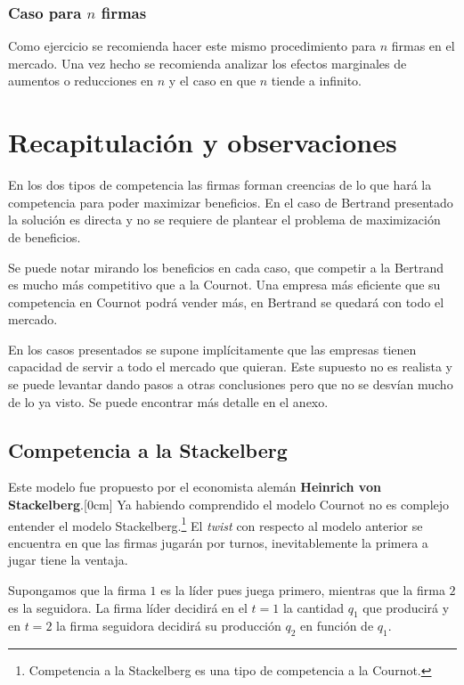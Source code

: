 \subsubsection*{Caso para $n$ firmas}
Como ejercicio se recomienda hacer este mismo procedimiento para $n$ firmas en el mercado. Una vez hecho se recomienda analizar los efectos marginales de aumentos o reducciones en $n$ y el caso en que $n$ tiende a infinito.


\section*{Recapitulación y observaciones}

En los dos tipos de competencia las firmas forman creencias de lo que hará la competencia para poder maximizar beneficios. En el caso de Bertrand presentado la solución es directa y no se requiere de plantear el problema de maximización de beneficios. 

Se puede notar mirando los beneficios en cada caso, que competir a la Bertrand es mucho más competitivo que a la Cournot. Una empresa más eficiente que su competencia en Cournot podrá vender más, en Bertrand se quedará con todo el mercado. 

En los casos presentados se supone implícitamente que las empresas tienen capacidad de servir a todo el mercado que quieran. Este supuesto no es realista y se puede levantar dando pasos a otras conclusiones pero que no se desvían mucho de lo ya visto. Se puede encontrar más detalle en el anexo. 

\subsection{Competencia a la Stackelberg}

Este modelo fue propuesto por el economista alemán \textbf{Heinrich von Stackelberg}.[0cm] Ya habiendo comprendido el modelo Cournot no es complejo entender el modelo Stackelberg.\footnote{Competencia a la Stackelberg es una tipo de competencia a la Cournot.} El \textit{twist} con respecto al modelo anterior se encuentra en que las firmas jugarán por turnos, inevitablemente la primera a jugar tiene la ventaja. 

Supongamos que la firma $1$ es la líder pues juega primero, mientras que la firma $2$ es la seguidora. La firma líder decidirá en el $t = 1$ la cantidad $q_1$ que producirá y en $t=2$ la firma seguidora decidirá su producción $q_2$ en función de $q_1$.

